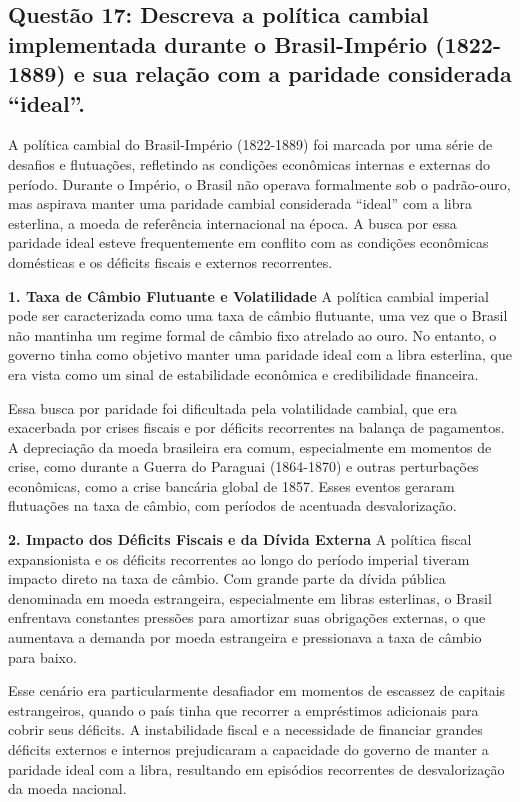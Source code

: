 \documentclass[a4paper,12pt]{article}[abntex2]
\begin{document}
\subsection{\textbf{Questão 17: Descreva a política cambial implementada durante o Brasil-Império (1822-1889) e sua relação com a paridade considerada “ideal”.}}

A política cambial do Brasil-Império (1822-1889) foi marcada por uma série de desafios e flutuações, refletindo as condições econômicas internas e externas do período. Durante o Império, o Brasil não operava formalmente sob o padrão-ouro, mas aspirava manter uma paridade cambial considerada “ideal” com a libra esterlina, a moeda de referência internacional na época. A busca por essa paridade ideal esteve frequentemente em conflito com as condições econômicas domésticas e os déficits fiscais e externos recorrentes.

\textbf{1. Taxa de Câmbio Flutuante e Volatilidade}
A política cambial imperial pode ser caracterizada como uma taxa de câmbio flutuante, uma vez que o Brasil não mantinha um regime formal de câmbio fixo atrelado ao ouro. No entanto, o governo tinha como objetivo manter uma paridade ideal com a libra esterlina, que era vista como um sinal de estabilidade econômica e credibilidade financeira. 

Essa busca por paridade foi dificultada pela volatilidade cambial, que era exacerbada por crises fiscais e por déficits recorrentes na balança de pagamentos. A depreciação da moeda brasileira era comum, especialmente em momentos de crise, como durante a Guerra do Paraguai (1864-1870) e outras perturbações econômicas, como a crise bancária global de 1857. Esses eventos geraram flutuações na taxa de câmbio, com períodos de acentuada desvalorização.

\textbf{2. Impacto dos Déficits Fiscais e da Dívida Externa}
A política fiscal expansionista e os déficits recorrentes ao longo do período imperial tiveram impacto direto na taxa de câmbio. Com grande parte da dívida pública denominada em moeda estrangeira, especialmente em libras esterlinas, o Brasil enfrentava constantes pressões para amortizar suas obrigações externas, o que aumentava a demanda por moeda estrangeira e pressionava a taxa de câmbio para baixo.

Esse cenário era particularmente desafiador em momentos de escassez de capitais estrangeiros, quando o país tinha que recorrer a empréstimos adicionais para cobrir seus déficits. A instabilidade fiscal e a necessidade de financiar grandes déficits externos e internos prejudicaram a capacidade do governo de manter a paridade ideal com a libra, resultando em episódios recorrentes de desvalorização da moeda nacional.
\end{document}
